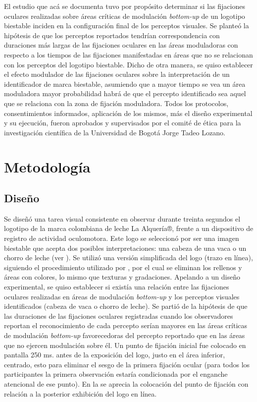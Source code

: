\documentclass[spanish]{textolivre}
\begin{document}
El estudio que acá se documenta tuvo por propósito determinar si las fijaciones oculares realizadas sobre áreas críticas de modulación \textit{bottom-up} de un logotipo biestable inciden en la configuración final de los perceptos visuales. Se planteó la hipótesis de que los perceptos reportados tendrían correspondencia con duraciones más largas de las fijaciones oculares en las áreas moduladoras con respecto a los tiempos de las fijaciones manifestadas en áreas que no se relacionan con los perceptos del logotipo biestable. Dicho de otra manera, se quiso establecer el efecto modulador de las fijaciones oculares sobre la interpretación de un identificador de marca biestable, asumiendo que a mayor tiempo se vea un área moduladora mayor probabilidad habrá de que el percepto identificado sea aquel que se relaciona con la zona de fijación moduladora. Todos los protocolos, consentimientos informados, aplicación de los mismos, más el diseño experimental y su ejecución, fueron aprobados y supervisados por el comité de ética para la investigación científica de la Universidad de Bogotá Jorge Tadeo Lozano.

\section{Metodología}\label{sec-normas}
\subsection{Diseño}

Se diseñó una tarea visual consistente en observar durante treinta segundos el logotipo de la marca colombiana de leche La Alquería®, frente a un dispositivo de registro de actividad oculomotora. Este logo se seleccionó por ser una imagen biestable que acepta dos posibles interpretaciones: una cabeza de una vaca o un chorro de leche (ver ). Se utilizó una versión simplificada del logo (trazo en línea), siguiendo el procedimiento utilizado por \textcite{groner_eye-movement_1983,marroquin-ciendua_modulacion_2020,rodriguez-martinez_can_2024}, por el cual se eliminan los rellenos y áreas con colores, lo mismo que texturas y gradaciones. Apelando a un diseño experimental, se quiso establecer si existía una relación entre las fijaciones oculares realizadas en áreas de modulación \textit{bottom-up} y los perceptos visuales identificados (cabeza de vaca o chorro de leche). Se partió de la hipótesis de que las duraciones de las fijaciones oculares registradas cuando los observadores reportan el reconocimiento de cada percepto serían mayores en las áreas críticas de modulación \textit{bottom-up} favorecedoras del percepto reportado que en las áreas que no ejercen modulación sobre él. Un punto de fijación inicial fue colocado en pantalla 250 ms. antes de la exposición del logo, justo en el área inferior, centrado, esto para eliminar el sesgo de la primera fijación ocular (para todos los participantes la primera observación estaría condicionada por el enganche atencional de ese punto). En la  se aprecia la colocación del punto de fijación con relación a la posterior exhibición del logo en línea.
\end{document}
